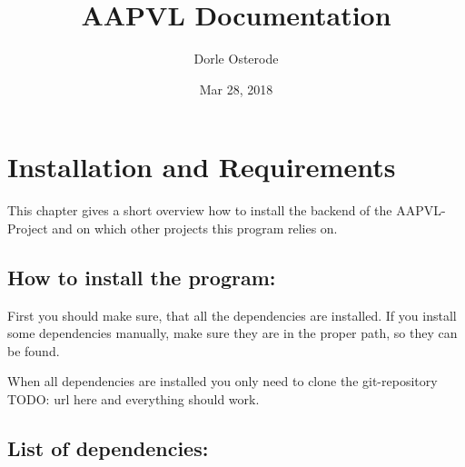 \documentclass[letterpaper,10pt,english]{sphinxmanual}
\title{AAPVL Documentation}
\date{Mar 28, 2018}
\author{Dorle Osterode}
\begin{document}
\maketitle
\sphinxtableofcontents
{}\label{\detokenize{index::doc}}



\chapter{Installation and Requirements}
\label{\detokenize{installation::doc}}\label{\detokenize{installation:installation-and-requirements}}\label{\detokenize{installation:welcome-to-aapvl-s-documentation}}\label{\detokenize{installation:installation}}
This chapter gives a short overview how to install the backend of the
AAPVL-Project and on which other projects this program relies on.


\section{How to install the program:}
\label{\detokenize{installation:how-to-install-the-program}}
First you should make sure, that all the dependencies are
installed. If you install some dependencies manually, make sure they
are in the proper path, so they can be found.

When all dependencies are installed you only need to clone the
git-repository TODO: url here and everything should work.


\section{List of dependencies:}
\label{\detokenize{installation:list-of-dependencies}}
\end{document}
